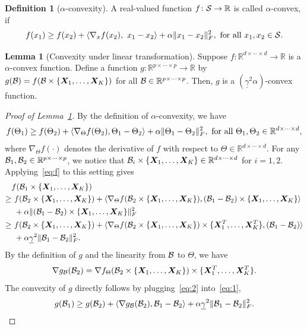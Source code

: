\documentclass[12pt]{article}
\theoremstyle{definition}
\newtheorem{lem}{Lemma}[section]
\newtheorem{defn}{Definition}[section]
\begin{document}
\begin{defn}[$\alpha$-convexity] A real-valued function $f\colon \mathcal{S} \to\mathbb{R}$ is called $\alpha$-convex, if
\[
f(x_1)\geq f(x_2)+\langle \nabla_xf(x_2),\ x_1-x_2\rangle+{\alpha}\FnormSize{}{x_1-x_2}^2,\ \text{for all }x_1,x_2\in\tS.
\]
\end{defn}
\begin{lem}[Convexity under linear transformation]\label{lem:convex}
Suppose $f\colon \mathbb{R}^{d\times \cdots\times d}\to \mathbb{R}$ is a $\alpha$-convex function. Define a function $g\colon \mathbb{R}^{p\times \cdots \times p}\to \mathbb{R}$ by
$g(\mathcal{B})=f(\mathcal{B}\times \{\bm X_1,\ldots,\bm X_K\})$ for all $\mathcal{B}\in\mathbb{R}^{p\times \cdots\times p}$. Then, $g$ is a $(\underline{\gamma}^2\alpha)$-convex function. 
\end{lem}
\begin{proof}[Proof of Lemma~\ref{lem:convex}]
By the definition of $\alpha$-convexity, we have
\begin{equation}\label{eq:f}
f(\Theta_1)\geq f(\Theta_2) + \langle \nabla_\Theta f(\Theta_2), \Theta_1-\Theta_2\rangle + \alpha\FnormSize{}{\Theta_1-\Theta_2}^2, \ \text{for all }\Theta_1,\Theta_2\in\mathbb{R}^{d\times \cdots\times d},
\end{equation}
where $\nabla_\Theta f(\cdot)$ denotes the derivative of $f$ with respect to $\Theta\in\mathbb{R}^{d\times \cdots\times d}$. For any $\mathcal{B}_1, \mathcal{B}_2\in\mathbb{R}^{p\times \cdots \times p}$, we notice that $\mathcal{B}_i\times\{\bm X_1,\ldots,\bm X_K\}\in\mathbb{R}^{d\times \cdots \times d}$ for $i=1,2$. Applying~\eqref{eq:f} to this setting gives
\begin{align}\label{eq:1}
&f(\tB_1\times\{\mX_1,\ldots,\mX_K\}) \notag \\
\geq &\ f(\tB_2\times\{\mX_1,\ldots,\mX_K\})+\langle  \nabla_\Theta f(\tB_2\times\{\mX_1,\ldots,\mX_K\}), (\tB_1-\tB_2)\times\{\mX_1,\ldots,\mX_K\} \rangle \notag \\
&\ +  \alpha\FnormSize{}{(\tB_1-\tB_2)\times\{\mX_1,\ldots,\mX_K\}}^2\notag \\
\geq &\ f(\tB_2\times\{\mX_1,\ldots,\mX_K\})+\langle  \nabla_\Theta f(\tB_2\times\{\mX_1,\ldots,\mX_K\})\times\{\mX^T_1,\ldots,\mX^T_K\}, (\tB_1-\tB_2)\rangle \notag \\
&\ + \alpha \underline{\gamma}^2  \FnormSize{}{\tB_1-\tB_2}^2.
\end{align}
By the definition of $g$ and the linearity from $\mathcal{B}$ to $\Theta$, we have
\begin{equation}\label{eq:2}
\nabla g_{\mathcal{B}}(\mathcal{B}_2)=\nabla f_\Theta (\mathcal{B}_2\times\{\bm X_1,\ldots,\bm X_K\}) \times\{\bm X^T_1,\ldots,\bm X^T_K\}.
\end{equation}
The convexity of $g$ directly follows by plugging~\eqref{eq:2} into~\eqref{eq:1},
\[
g(\mathcal{B}_1)\geq g(\mathcal{B}_2)  +\langle \nabla g_{\mathcal{B}}(\mathcal{B}_2), \mathcal{B}_1-\mathcal{B}_2\rangle + \alpha \underline{\gamma}^2  \lVert\mathcal{B}_1-\mathcal{B}_2\rVert_F^2.
\]
\end{proof}
\end{document}
